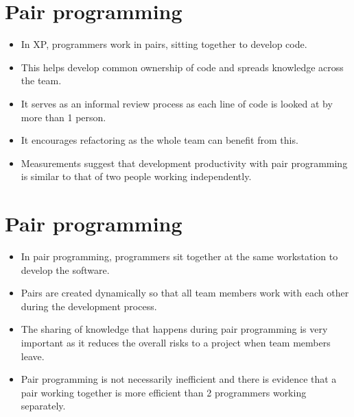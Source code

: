 \section{ Pair programming}
\begin{itemize}

\item In XP, programmers work in pairs, sitting together to develop code.

\item This helps develop common ownership of code and spreads knowledge across the team.

\item It serves as an informal review process as each line of code is looked at by more than 1 person.

\item It encourages refactoring as the whole team can benefit from this.

\item Measurements suggest that development productivity with pair programming is similar to that of two people working independently.

\end{itemize}
\section{ Pair programming}
\begin{itemize}

\item In pair programming, programmers sit together at the same workstation to develop the software.

\item Pairs are created dynamically so that all team members work with each other during the development process.

\item The sharing of knowledge that happens during pair programming is very important as it reduces the overall risks to a project when team members leave.

\item Pair programming is not necessarily inefficient and there is evidence that a pair working together is more efficient than 2 programmers working separately.
\end{itemize}
